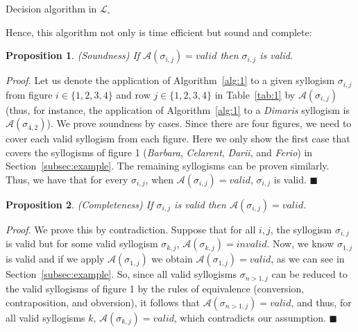 \documentclass[a4paper,UKenglish]{lipics}
\newtheorem {mytheorem}{Proposition}
\begin{document}
\begin{algorithm}
  \SetAlgoLined\scriptsize
  \caption{Decision algorithm in $\mathcal{L}_{\square}$}
  \label{alg:1}
\end{algorithm}

Hence, this algorithm not only is time efficient but sound and complete:

\begin{mytheorem}
(Soundness) If $\mathcal{A}(\sigma_{i,j})=valid$ then $\sigma_{i,j}$ is valid.
\end{mytheorem}
\textit{Proof.} Let us denote the application of Algorithm~\ref{alg:1} to a given syllogism $\sigma_{i,j}$ from figure $i\in\lbrace 1,2,3,4 \rbrace$ and row $j\in\lbrace 1,2,3,4 \rbrace$ in Table~\ref{tab:1} by $\mathcal{A}(\sigma_{i,j})$ (thus, for instance, the application of Algorithm~\ref{alg:1} to a \textit{Dimaris} syllogism is $\mathcal{A}(\sigma_{4,2})$). We prove soundness by cases. Since there are four figures, we need to cover each valid syllogism from each figure. Here we only show the first case that covers the syllogisms of figure 1 (\textit{Barbara}, \textit{Celarent}, \textit{Darii}, and \textit{Ferio}) in Section~\ref{subsec:example}. The remaining syllogisms can be proven similarly. Thus, we have that for every $\sigma_{i,j}$, when $\mathcal{A}(\sigma_{i,j})=valid$, $\sigma_{i,j}$ is valid. $\blacksquare$ 

\begin{mytheorem}
(Completeness) If $\sigma_{i,j}$ is valid then $\mathcal{A}(\sigma_{i,j})=valid$.
\end{mytheorem}
\textit{Proof}. We prove this by contradiction. Suppose that for all $i,j$, the syllogism $\sigma_{i,j}$ is valid but for some valid syllogism $\sigma_{k,j}$,  $\mathcal{A}(\sigma_{k,j})=invalid$. Now, we know $\sigma_{1,j}$ is valid and if we apply $\mathcal{A}(\sigma_{1,j})$ we obtain $\mathcal{A}(\sigma_{1,j})=valid$, as we can see in Section~\ref{subsec:example}. So, since all valid syllogisms $\sigma_{n>1,j}$ can be reduced to the valid syllogisms of figure 1 by the rules of equivalence (conversion, contraposition, and obversion), it follows that $\mathcal{A}(\sigma_{n>1,j})=valid$, and thus, for all valid syllogisms $k$, $\mathcal{A}(\sigma_{k,j})=valid$, which contradicts our assumption. $\blacksquare$
\end{document}
